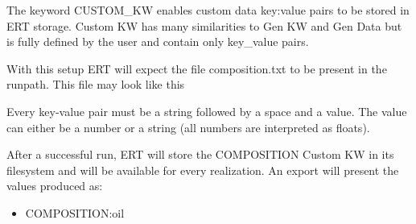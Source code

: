 \documentclass[letterpaper,10pt,english]{sphinxmanual}
\begin{document}
\label{\detokenize{keywords/index:custom-kw}}
\begin{sphinxShadowBox}

The keyword CUSTOM\_KW enables custom data key:value pairs
to be stored in ERT storage.  Custom KW has many
similarities to Gen KW and Gen Data but is fully defined by
the user and contain only key\_value pairs.


%
\begin{sphinxVerbatim}[commandchars=\\\{\}]
  

                

            

  
\end{sphinxVerbatim}

With this setup ERT will expect the file composition.txt to be present in the runpath.
This file may look like this

%
\begin{sphinxVerbatim}[commandchars=\\\{\}]
 
 
 
 
 
\end{sphinxVerbatim}

Every key-value pair must be a string followed by a space and a value.
The value can either be a number or a string (all numbers are interpreted as floats).

After a successful run, ERT will store the COMPOSITION
Custom KW in its filesystem and will be available for every
realization.  An export will present the values produced as:
\begin{itemize}
\item {} 
COMPOSITION:oil


\end{itemize}
\end{sphinxShadowBox}
\end{document}
